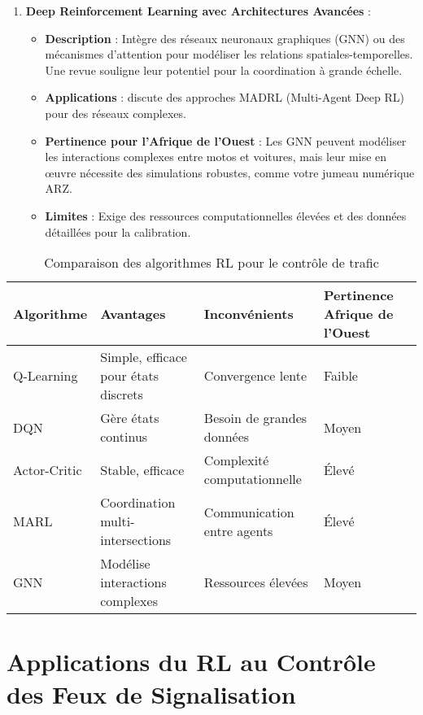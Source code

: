 \begin{enumerate}
    \item \textbf{Deep Reinforcement Learning avec Architectures Avancées} :  
        \begin{itemize}
            \item \textbf{Description} : Intègre des réseaux neuronaux graphiques (GNN) ou des mécanismes d'attention pour modéliser les relations spatiales-temporelles. Une revue \cite{survey2025reinforcement} souligne leur potentiel pour la coordination à grande échelle.
            \item \textbf{Applications} : \cite{survey2025reinforcement} discute des approches MADRL (Multi-Agent Deep RL) pour des réseaux complexes.
            \item \textbf{Pertinence pour l'Afrique de l'Ouest} : Les GNN peuvent modéliser les interactions complexes entre motos et voitures, mais leur mise en œuvre nécessite des simulations robustes, comme votre jumeau numérique ARZ.
            \item \textbf{Limites} : Exige des ressources computationnelles élevées et des données détaillées pour la calibration.
        \end{itemize}
\end{enumerate}

\begin{table}[ht]
    \centering
    \caption{Comparaison des algorithmes RL pour le contrôle de trafic}
    \label{tab:algo_comparison}
    \begin{tabular}{llll}
        \toprule
        \textbf{Algorithme} & \textbf{Avantages} & \textbf{Inconvénients} & \textbf{Pertinence Afrique de l'Ouest} \\
        \midrule
        Q-Learning & Simple, efficace pour états discrets & Convergence lente & Faible \\
        DQN & Gère états continus & Besoin de grandes données & Moyen \\
        Actor-Critic & Stable, efficace & Complexité computationnelle & Élevé \\
        MARL & Coordination multi-intersections & Communication entre agents & Élevé \\
        GNN & Modélise interactions complexes & Ressources élevées & Moyen \\
        \bottomrule
    \end{tabular}
\end{table}

\section{Applications du RL au Contrôle des Feux de Signalisation}
\label{sec:rl_applications}

